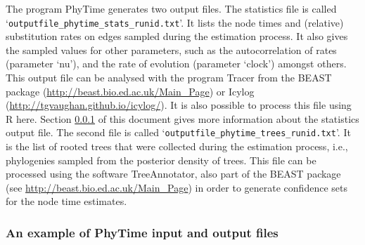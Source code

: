 \documentclass[a4paper,12pt]{article}
\newcommand{\x}[1]{\texttt{#1}}
\begin{document}
The     program     PhyTime     generates     two     output     files.      The statistics file
is called  `\x{outputfile\_phytime\_stats\_runid.txt}'. It lists the
node times  and (relative) substitution rates on edges  sampled during the  estimation process.   It
also  gives the sampled values for other parameters, such as  the autocorrelation of rates
(parameter `nu'), and the rate of evolution (parameter `clock') amongst others.   This output file
can  be analysed with the program        Tracer        from         the
BEAST        package (\url{http://beast.bio.ed.ac.uk/Main_Page}) or Icylog
(\url{http://tgvaughan.github.io/icylog/}). It is also possible to process this file using R here. Section
\ref{sec:phytimeexample} of this document gives more information about the statistics output file.       The       second      file       is
called `\x{outputfile\_phytime\_trees\_runid.txt}'.  It is  the list of rooted trees that were  collected
during the estimation process, i.e., phylogenies sampled from the posterior density of trees.  This
file can be processed   using   the   software   TreeAnnotator,   also  part   of   the   BEAST
package   (see \url{http://beast.bio.ed.ac.uk/Main_Page}) in  order to generate  confidence sets for
the  node time estimates.


\subsubsection{An example of PhyTime input and output files}\label{sec:phytimeexample}
\end{document}
